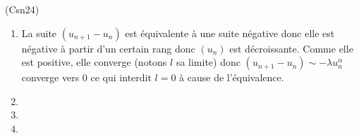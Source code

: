 \begin{tiny}(Csn24)\end{tiny}
\begin{enumerate}
  \item La suite $(u_{n+1}- u_n)$ est équivalente à une suite négative donc elle est négative à partir d'un certain rang donc $(u_n)$ est décroissante. Comme elle est positive, elle converge (notons $l$ sa limite) donc $(u_{n+1} - u_n) \sim -\lambda u_n^\alpha$ converge vers 0 ce qui interdit $l=0$ à cause de l'équivalence.
  \item 
  \item
  \item 
\end{enumerate}
